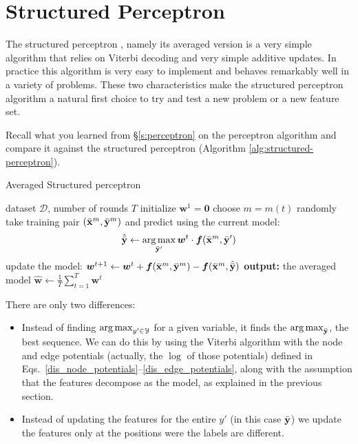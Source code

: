 \section{\label{s:spercetron}Structured Perceptron}

The structured perceptron \citep{collins2002discriminative}, namely its averaged version is a very simple
algorithm that relies on Viterbi decoding and very simple additive
updates. In practice this algorithm is very easy to implement and
behaves remarkably well in a variety of problems. These two
characteristics make the structured perceptron algorithm a natural
first choice to try and test a new problem or a new feature set. 

Recall what you learned from \S\ref{s:perceptron} on the
perceptron algorithm and compare it against the structured perceptron
(Algorithm \ref{alg:structured-perceptron}). 

\begin{algorithm}[t]
   \caption{Averaged Structured perceptron \label{alg:structured-perceptron}}
\begin{algorithmic}[1]
    dataset $\mathcal{D}$, number of rounds $T$
   \STATE initialize $\boldsymbol{w}^1 = \mathbf{0}$
	\STATE choose $m = m(t)$ randomly
	\STATE take training pair $(\bar{\mathbf{x}}^m, \bar{\mathbf{y}}^m)$ and predict using the current model: 
	$$\hat{\bar{\mathbf{y}}}  \leftarrow \operatorname*{arg\,max}_{\bar{\mathbf{y}}'} \boldsymbol{w}^t \cdot \boldsymbol{f}(\bar{\mathbf{x}}^m,\bar{\mathbf{y}}')$$
	\STATE update the model: 
	$\boldsymbol{w}^{t+1} \leftarrow \boldsymbol{w}^{t} + \boldsymbol{f}(\bar{\mathbf{x}}^m,\bar{\mathbf{y}}^m) - \boldsymbol{f}(\bar{\mathbf{x}}^m,\hat{\bar{\mathbf{y}}})$
	\ENDFOR
   \STATE \textbf{output:} the averaged model $\hat{\boldsymbol{w}} \leftarrow \frac{1}{T}\sum_{t=1}^T \boldsymbol{w}^t$
\end{algorithmic}
\end{algorithm}

There are only two differences:
\begin{itemize}
\item Instead of finding $\operatorname*{arg\,max}_{y'\in\mathcal{Y}}$ for a given
  variable, it finds the $\operatorname*{arg\,max}_{\bar{\mathbf{y}}}$, the best sequence. We can
  do this by using the Viterbi algorithm with the node and edge potentials 
  (actually, the $\log$ of those potentials) defined in Eqs.~\ref{dis_node_potentials}--\ref{dis_edge_potentials}, 
  along with the assumption that the features
  decompose as the model, as explained in the previous section.
\item Instead of updating the features for the entire $y'$ (in this
  case $\bar{\mathbf{y}}$) we update the features only at the positions were the
  labels are different. 
\end{itemize}


